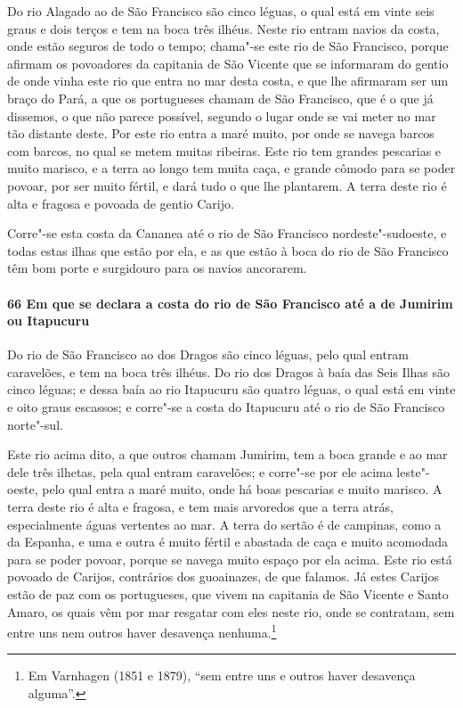 \begin{linenumbers}
Do rio Alagado ao de São Francisco são cinco léguas, o qual está em vinte seis graus e
dois terços e tem na boca três ilhéus. Neste rio entram navios da costa, onde estão
seguros de todo o tempo; chama"-se este rio de São Francisco, porque afirmam os povoadores
da capitania de São Vicente que se informaram do gentio de onde vinha este rio que entra
no mar desta costa, e que lhe afirmaram ser um braço do Pará, a que os portugueses chamam
de São Francisco, que é o que já dissemos, o que não parece possível, segundo o lugar onde
se vai meter no mar tão distante deste. Por este rio entra a maré muito, por onde se
navega barcos com barcos, no qual se metem muitas ribeiras. Este rio tem grandes pescarias
e muito marisco, e a terra ao longo tem muita caça, e grande cômodo para se poder povoar,
por ser muito fértil, e dará tudo o que lhe plantarem. A terra deste rio é alta e fragosa
e povoada de gentio Carijo.

Corre"-se esta costa da Cananea até o rio de São Francisco nordeste"-sudoeste, e todas estas
ilhas que estão por ela, e as que estão à boca do rio de São Francisco têm bom porte e
surgidouro para os navios ancorarem.

\paragraph{66 Em que se declara a costa do rio de São Francisco até a de Jumirim ou
Itapucuru} \quad
Do rio de São Francisco ao dos Dragos são cinco léguas, pelo qual entram caravelões, e tem
na boca três ilhéus. Do rio dos Dragos à baía das Seis Ilhas são cinco léguas; e dessa
baía ao rio Itapucuru são quatro léguas, o qual está em vinte e oito graus escassos; e
corre"-se a costa do Itapucuru até o rio de São Francisco norte"-sul.

Este rio acima dito, a que outros chamam Jumirim, tem a boca grande e ao mar dele três
ilhetas, pela qual entram caravelões; e corre"-se por ele acima leste"-oeste, pelo qual
entra a maré muito, onde há boas pescarias e muito marisco. A terra deste rio é alta e
fragosa, e tem mais arvoredos que a terra atrás, especialmente águas vertentes ao mar. A
terra do sertão é de campinas, como a da Espanha, e uma e outra é muito fértil e abastada
de caça e muito acomodada para se poder povoar, porque se navega muito espaço por ela
acima. Este rio está povoado de Carijos, contrários dos guoainazes, de que falamos. Já
estes Carijos estão de paz com os portugueses, que vivem na capitania de São Vicente e
Santo Amaro, os quais vêm por mar resgatar com eles neste rio, onde se contratam, sem
entre uns nem outros haver desavença nenhuma.\footnote{ Em Varnhagen (1851 e 1879), ``sem
entre uns e outros haver desavença alguma''.}


\end{linenumbers}
